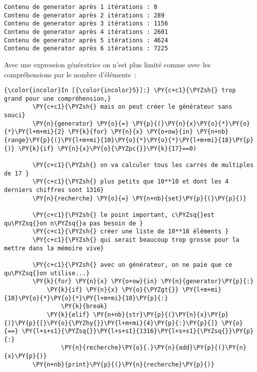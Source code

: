     \begin{Verbatim}[commandchars=\\\{\}]
Contenu de generator après 1 itérations : 0
Contenu de generator après 2 itérations : 289
Contenu de generator après 3 itérations : 1156
Contenu de generator après 4 itérations : 2601
Contenu de generator après 5 itérations : 4624
Contenu de generator après 6 itérations : 7225

    \end{Verbatim}

    Avec une expression génératrice on n'est plus limité comme avec les
compréhensions par le nombre d'éléments~:

    \begin{Verbatim}[commandchars=\\\{\}]
{\color{incolor}In [{\color{incolor}5}]:} \PY{c+c1}{\PYZsh{} trop grand pour une compréhension,}
        \PY{c+c1}{\PYZsh{} mais on peut créer le générateur sans souci}
        \PY{n}{generator} \PY{o}{=} \PY{p}{(}\PY{n}{x}\PY{o}{*}\PY{o}{*}\PY{l+m+mi}{2} \PY{k}{for} \PY{n}{x} \PY{o+ow}{in} \PY{n+nb}{range}\PY{p}{(}\PY{l+m+mi}{10}\PY{o}{*}\PY{o}{*}\PY{l+m+mi}{18}\PY{p}{)} \PY{k}{if} \PY{n}{x}\PY{o}{\PYZpc{}}\PY{k}{17}==0) 
        
        \PY{c+c1}{\PYZsh{} on va calculer tous les carrés de multiples de 17 }
        \PY{c+c1}{\PYZsh{} plus petits que 10**10 et dont les 4 derniers chiffres sont 1316}
        \PY{n}{recherche} \PY{o}{=} \PY{n+nb}{set}\PY{p}{(}\PY{p}{)}
        
        \PY{c+c1}{\PYZsh{} le point important, c\PYZsq{}est qu\PYZsq{}on n\PYZsq{}a pas besoin de }
        \PY{c+c1}{\PYZsh{} créer une liste de 10**18 éléments }
        \PY{c+c1}{\PYZsh{} qui serait beaucoup trop grosse pour la mettre dans la mémoire vive}
        
        \PY{c+c1}{\PYZsh{} avec un générateur, on ne paie que ce qu\PYZsq{}on utilise...}
        \PY{k}{for} \PY{n}{x} \PY{o+ow}{in} \PY{n}{generator}\PY{p}{:}
            \PY{k}{if} \PY{n}{x} \PY{o}{\PYZgt{}} \PY{l+m+mi}{10}\PY{o}{*}\PY{o}{*}\PY{l+m+mi}{10}\PY{p}{:}
                \PY{k}{break}
            \PY{k}{elif} \PY{n+nb}{str}\PY{p}{(}\PY{n}{x}\PY{p}{)}\PY{p}{[}\PY{o}{\PYZhy{}}\PY{l+m+mi}{4}\PY{p}{:}\PY{p}{]} \PY{o}{==} \PY{l+s+s1}{\PYZsq{}}\PY{l+s+s1}{1316}\PY{l+s+s1}{\PYZsq{}}\PY{p}{:}
                \PY{n}{recherche}\PY{o}{.}\PY{n}{add}\PY{p}{(}\PY{n}{x}\PY{p}{)}
        \PY{n+nb}{print}\PY{p}{(}\PY{n}{recherche}\PY{p}{)}
\end{Verbatim}


